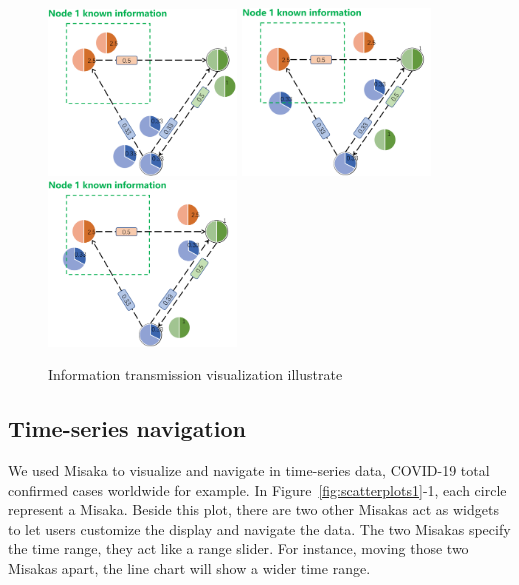 \documentclass[conference]{IEEEtran}
\begin{document}
\begin{figure}[ht]
    \centering
    \includegraphics[width=5cm]{PPT1.png}
    \includegraphics[width=5cm]{PPT2.png}
    \includegraphics[width=5cm]{PPT3.png}
    \caption{Information transmission visualization illustrate}
\label{fig:PPT}
\end{figure}

\subsection{Time-series navigation}

We used Misaka to visualize and navigate in time-series data, COVID-19 total confirmed cases worldwide for example. In Figure~\ref{fig:scatterplots1}-1, each circle represent a Misaka. Beside this plot, there are two other Misakas act as widgets to let users customize the display and navigate the data. The two Misakas specify the time range, they act like a range slider\cite{ahlberg1992dynamic}. For instance, moving those two Misakas apart, the line chart will show a wider time range.

\end{document}
